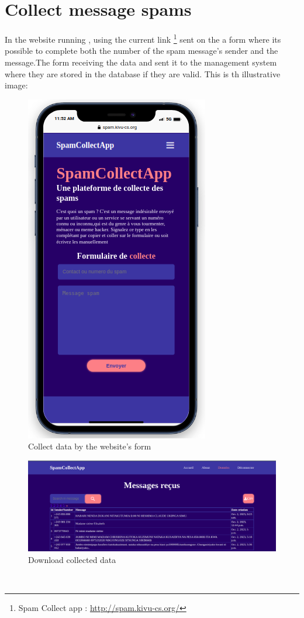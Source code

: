 \documentclass[12pt,a4paper, oneside]{book}
\begin{document}
\section{Collect message spams} 
In the website running , using the current link \footnote{Spam Collect app : \url{http://spam.kivu-cs.org/}} sent on the a form where its possible to complete both the number of the spam message's sender and the message.The form receiving the data and sent it to the management system where they are stored in the database if they are valid. This is th illustrative image:
\begin{figure}[h]
	\centering
	\includegraphics[width=0.4\linewidth]{CollectImages/spamForm}
	\caption{Collect data by the website's form}
	\label{fig:spamform}
\end{figure} 
\begin{figure}[h]
	\centering
	\includegraphics[width=1\linewidth]{CollectImages/collectData}
	\caption{Download collected data}
	\label{fig:collectdata} 	
\end{figure}
\\
\end{document}
